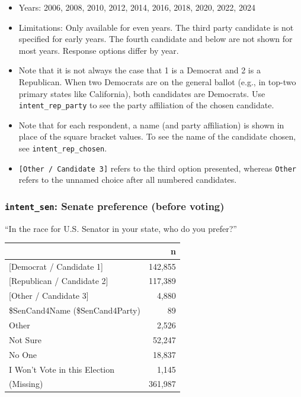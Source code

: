 \documentclass[10pt,article,oneside]{memoir}
\begin{document}
\begin{itemize}
\tightlist
\item
  Years: 2006, 2008, 2010, 2012, 2014, 2016, 2018, 2020, 2022, 2024
\item
  Limitations: Only available for even years. The third party candidate
  is not specified for early years. The fourth candidate and below are
  not shown for most years. Response options differ by year.
\item
  Note that it is not always the case that 1 is a Democrat and 2 is a
  Republican. When two Democrats are on the general ballot (e.g., in
  top-two primary states like California), both candidates are
  Democrats. Use \texttt{intent\_rep\_party} to see the party
  affiliation of the chosen candidate.
\item
  Note that for each respondent, a name (and party affiliation) is shown
  in place of the square bracket values. To see the name of the
  candidate chosen, see \texttt{intent\_rep\_chosen}.
\item
  \texttt{{[}Other\ /\ Candidate\ 3{]}} refers to the third option
  presented, whereas \texttt{Other} refers to the unnamed choice after
  all numbered candidates.
\end{itemize}

\subsubsection{\texorpdfstring{\texttt{intent\_sen}: Senate preference
(before
voting)}{intent\_sen: Senate preference (before voting)}}\label{intent_sen-senate-preference-before-voting}

``In the race for U.S. Senator in your state, who do you prefer?''

\begin{table}[H]
\centering
\begin{tabular}[t]{lr}
\toprule
 & n\\
\midrule
{}{[Democrat / Candidate 1]} & 142,855\\
{}{[Republican / Candidate 2]} & 117,389\\
{}{[Other / Candidate 3]} & 4,880\\
\$SenCand4Name (\$SenCand4Party) & 89\\
Other & 2,526\\
Not Sure & 52,247\\
No One & 18,837\\
I Won't Vote in this Election & 1,145\\
(Missing) & 361,987\\
\bottomrule
\end{tabular}
\end{table}
\end{document}
